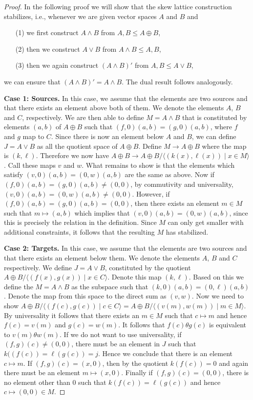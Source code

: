 \documentclass[10pt]{amsart}
\newcommand{\rto}{\rightarrow}
\newcommand{\meet}{\wedge}
\newcommand{\join}{\vee}
\begin{document}
\begin{proof}
In the following proof we will show that the skew lattice construction stabilizes, i.e., whenever we are given vector spaces $A$ and $B$ and
\begin{itemize}
\item[(1)] we first construct $A\wedge B$ from $A,B\leq A\oplus B$, 
\item[(2)] then we construct $A\vee B$ from $A\wedge B\leq A,B$, 
\item[(3)] then we again construct $(A\wedge B)'$ from $A,B\leq A\vee B$,
\end{itemize}

\noindent we can ensure that $(A\wedge B)'=A\wedge B$.
The dual result follows analogously.

\textbf{Case 1: Sources.}
In this case, we assume that the elements are two sources and that there exists an element above both of them. We denote the elements $A$, $B$ and $C$, respectively. We are then able to define $M=A\meet B$ that is constituted by elements $(a,b)$ of $A\oplus B$ such that $(f,0)(a,b) = (g,0)(a,b)$, where $f$ and $g$ map to $C$. Since there is now an element below $A$ and $B$, we can define  $J=A\join B$ as all the quotient space of $A\oplus B$. Define $M\rto A\oplus B$  where the map is $(k,\ell)$. Therefore we now have $A\oplus B \rto A\oplus B /\langle (k(x), \ell(x)) \mid x\in M \rangle$. Call these maps $v$ and $w$. What remains to show is that the elements which satisfy  $(v,0)(a,b) = (0,w)(a,b)$ are the same as above. Now if $(f,0)(a,b) = (g,0)(a,b)\neq (0,0)$, by commutivity and universality,  $(v,0)(a,b) = (0,w)(a,b)\neq (0,0)$. However, if $(f,0)(a,b) = (g,0)(a,b) =  (0,0)$, then there exists an element $m \in M$ such that $m\mapsto (a,b)$ which implies that $(v,0)(a,b) = (0,w)(a,b)$, since this is precisely the relation in the definition.  Since $M$ can only get smaller with additional constraints, it follows that the resulting $M$ has stabilized.

\textbf{Case 2: Targets.}
In this case, we assume that the elements are two sources and that there exists an element below them. We denote the elements $A$, $B$ and $C$ respectively. We define  $J=A\join B$, constituted by the quotient  $A\oplus B / \langle (f(x), g(x))\mid x\in C \rangle$. Denote this map $(k,\ell)$. Based on this we define the $M=A\meet B$ as the subspace such that $(k,0)(a,b) =(0,\ell)(a,b)$. Denote the map from this space to the direct sum as $(v,w)$. Now we need to show $A\oplus B /\langle (f(c), g(c))\mid c\in C \rangle = A\oplus B /\langle (v(m), w(m))\mid m\in M \rangle$. By universality  it follows that there exists an $m \in M $ such that $c \mapsto m$ and hence $f(c) = v(m)$ and $g(c) = w(m)$. It follows that $f(c) \theta g(c)$ is equivalent to  $v(m) \theta w(m)$. 
%
If we do not want to use universality, if $(f,g)(c)\neq (0,0)$, there must be an element in $J$ such that $k((f(c)) = \ell(g(c))=j$. Hence we conclude that there is an element $c\mapsto m$. If $(f,g)(c) =  (x,0)$, then  by the quotient $k(f(c)) = 0 $ and again there must be an element $m \mapsto (x,0)$.  Finally if $(f,g)(c) =  (0,0)$, there is no element other than 0 such that $k(f(c)) = \ell(g(c))$ and hence $c \mapsto (0,0) \in M$. 


\end{proof}
\end{document}
